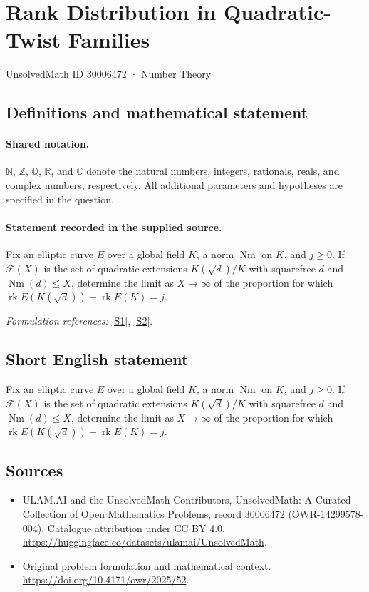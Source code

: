 \documentclass[11pt]{article}
\newcommand{\sref}[2]{\hyperlink{source:#1:#2}{[S#2]}}
\begin{document}
\setcounter{section}{30006471}
\section{Rank Distribution in Quadratic-Twist Families}\label{30006472}
{\small UnsolvedMath ID 30006472 · Number Theory}
\subsection{Definitions and mathematical statement}

\paragraph{Shared notation.}$\mathbb N$, $\mathbb Z$, $\mathbb Q$, $\mathbb R$, and $\mathbb C$ denote the natural numbers, integers, rationals, reals, and complex numbers, respectively. All additional parameters and hypotheses are specified in the question.


\paragraph{Statement recorded in the supplied source.}
Fix an elliptic curve $E$ over a global field $K$, a norm $\operatorname{Nm}$ on $K$, and $j\geq0$. If $\mathcal{F}(X)$ is the set of quadratic extensions $K(\sqrt{d})/K$ with squarefree $d$ and $\operatorname{Nm}(d)\leq X$, determine the limit as $X\to\infty$ of the proportion for which $\operatorname{rk}E(K(\sqrt{d}))-\operatorname{rk}E(K)=j$.
\par\smallskip\textit{Formulation references:} \sref{30006472}{1}, \sref{30006472}{2}.
\subsection{Short English statement}
Fix an elliptic curve $E$ over a global field $K$, a norm $\operatorname{Nm}$ on $K$, and $j\geq0$. If $\mathcal{F}(X)$ is the set of quadratic extensions $K(\sqrt{d})/K$ with squarefree $d$ and $\operatorname{Nm}(d)\leq X$, determine the limit as $X\to\infty$ of the proportion for which $\operatorname{rk}E(K(\sqrt{d}))-\operatorname{rk}E(K)=j$.
\subsection{Sources}
\begin{itemize}
\item[\hypertarget{source:30006472:1}{S1}] ULAM.AI and the UnsolvedMath Contributors, UnsolvedMath: A Curated Collection of Open Mathematics Problems, record 30006472 (OWR-14299578-004). Catalogue attribution under CC BY 4.0.
\url{https://huggingface.co/datasets/ulamai/UnsolvedMath}.
\item[\hypertarget{source:30006472:2}{S2}] Original problem formulation and mathematical context.
\url{https://doi.org/10.4171/owr/2025/52}.
\end{itemize}
\label{end:30006472}
\end{document}
